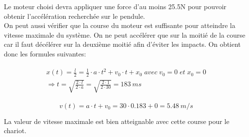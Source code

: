 Le moteur choisi devra appliquer une force d'au moins 25.5N pour pouvoir obtenir l'accélération recherchée sur le pendule.\\

On peut aussi vérifier que la course du moteur est suffisante pour atteindre la vitesse maximale du système. On ne peut accélérer que sur la
moitié de la course car il faut décélérer sur la deuxième moitié afin d'éviter les impacts. On obtient donc les formules suivantes:

\begin{align}\label{eq:TempsMouv}
    \begin{split}
        x(t) = \frac{l}{2} = \frac{1}{2} \cdot a \cdot t^2 + v_0 \cdot t + x_0 \; avec \; v_0 = 0 \; et \; x_0 = 0 \\ \Rightarrow t = \sqrt{\frac{2 \cdot l}{2 \cdot a}} = \sqrt{\frac{2 \cdot 1}{2 \cdot 30}} = 183~ms
    \end{split}
\end{align}

\begin{equation}
    v(t) = a \cdot t + v_0 = 30 \cdot 0.183 + 0 = 5.48~m/s
\end{equation}

La valeur de vitesse maximale est bien atteignable avec cette course pour le chariot.